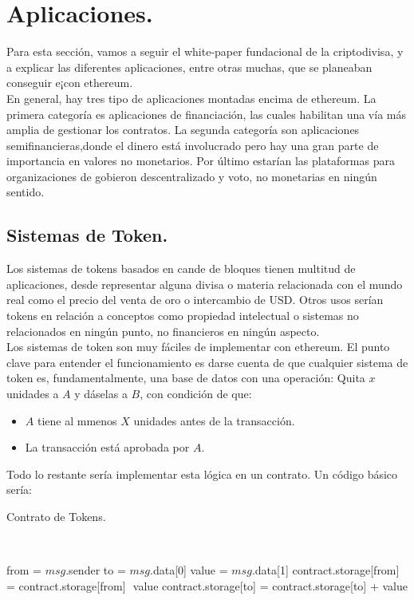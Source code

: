 \documentclass[11pt,a4paper]{article}
\begin{document}
\section {Aplicaciones.} 
Para esta sección, vamos a seguir el white-paper fundacional de la criptodivisa, y a explicar las diferentes aplicaciones, entre otras muchas, que se planeaban conseguir e¡con ethereum.\\

En general, hay tres tipo de aplicaciones montadas encima de ethereum. La primera categoría es aplicaciones de financiación, las cuales habilitan una vía más amplia de gestionar los contratos. La segunda categoría son aplicaciones semifinancieras,donde el dinero está involucrado pero hay una gran parte de importancia en valores no monetarios. Por último estarían las plataformas para organizaciones de gobieron descentralizado y voto, no monetarias en ningún sentido.

\subsection{Sistemas de Token.}

Los sistemas de tokens basados en cande de bloques tienen multitud de aplicaciones, desde representar alguna divisa o materia relacionada con el mundo real como el precio del venta de oro o intercambio de USD. Otros usos serían tokens en relación a conceptos como propiedad intelectual o sistemas no relacionados en ningún punto, no financieros en ningún aspecto. \\

Los sistemas de token son muy fáciles de implementar con ethereum. El punto clave para entender el funcionamiento es darse cuenta de que cualquier sistema de token es, fundamentalmente, una base de datos con una operación: Quita $x$ unidades a $A$ y dáselas a $B$, con condición de que:
\begin{itemize}
\item $A$ tiene al mmenos $X$ unidades antes de la transacción.
\item La transacción está aprobada por $A$. 
\end{itemize}

Todo lo restante sería implementar esta lógica en un contrato. Un código básico sería:\\


\begin{algorithm}
  \caption{Contrato de Tokens.}\label{token}
  \begin{algorithmic}[1]
    			\\ 
    
    \State from = $msg$.sender
    \State to = $msg$.data[0]
    \State value = $msg$.data[1]
    \State contract.storage[from] = contract.storage[from] ­ value
    \State contract.storage[to] = contract.storage[to] + value
    \EndIf
    \EndProcedure
  \end{algorithmic}
\end{algorithm}
\end{document}
